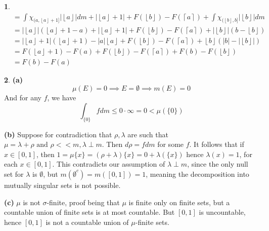 \documentclass[10.5pt]{article}
\theoremstyle{definition}
\newtheorem{pb}{}
\newcommand{\set}[1]{\{#1\}}
\newcommand{\abs}[1]{\left\vert#1\right\vert}
\newcommand{\tand}{\text{ and }}
\newcommand{\floor}[1]{\left\lfloor #1 \right\rfloor}
\newcommand{\ceil}[1]{\left\lceil #1 \right\rceil}
\begin{document}
\begin{pb}
\begin{align*}
            &= \int \chi_{(a,\floor{a}+1]}\abs{\floor{a}}dm + \abs{\floor{a} + 1} + F(\floor{b}) - F(\ceil{a}) + \int \chi_{(\floor{b},b]} \abs{\floor{b}} dm\\
            &= \abs{\floor{a}}(\floor{a} + 1 - a) + \abs{\floor{a} + 1} + F(\floor{b}) - F(\ceil{a}) + \abs{\floor{b}}(b - \floor{b})\\
            &= \abs{\floor{a}+1}(\floor{a}+1) - \abs{a}\floor{a} + F(\floor{b}) - F(\ceil{a}) + \floor{b}(\abs{b} - \abs{\floor{b}})\\
            &= F(\floor{a}+1) - F(a) + F(\floor{b}) - F(\ceil{a}) + F(b) - F(\floor{b})\\
            &= F(b) - F(a)
        \end{align*}
    \end{pb}
    \begin{pb}
        \textbf{(a)}
        \[\mu(E) = 0 \implies E = \emptyset \implies m(E) = 0\]
        And for any \(f\), we have
        \[\int_{\set{0}}f dm \leq 0 \cdot \infty = 0 < \mu(\set{0})\]

        \textbf{(b)} Suppose for contradiction that \(\rho, \lambda\) are such that \(\mu = \lambda+\rho \tand \rho << m, \lambda \perp m\). Then \(d\rho = f dm\) for some \(f\).
        It follows that if \(x \in [0,1]\), then \(1 = \mu\set{x} = (\rho + \lambda)\set{x} = 0 + \lambda(\set{x})\) hence \(\lambda(x) = 1\), for each \(x \in [0,1]\). 
        This contradicts our assumption of \(\lambda \perp m\), since the only null set for \(\lambda\) is \(\emptyset\), but \(m(\emptyset^c) = m([0,1]) = 1\), 
        meaning the decomposition into mutually singular sets is not possible.

        \textbf{(c)} \(\mu\) is not \(\sigma\)-finite, proof being that \(\mu\) is finite only on finite sets, but a countable union of finite sets is at most countable.
        But \([0,1]\) is uncountable, hence \([0,1]\) is not a countable union of \(\mu\)-finite sets.
    \end{pb}
\end{document}
